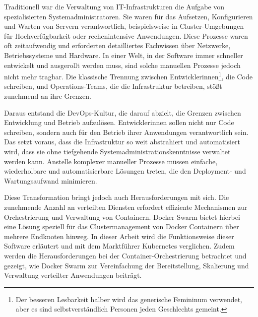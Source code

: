 Traditionell war die Verwaltung von IT-Infrastrukturen die Aufgabe von spezialisierten Systemadministratoren. Sie waren für das Aufsetzen, Konfigurieren und Warten von Servern verantwortlich, beispielsweise in Cluster-Umgebungen für Hochverfügbarkeit oder rechenintensive Anwendungen. Diese Prozesse waren oft zeitaufwendig und erforderten detailliertes Fachwissen über Netzwerke, Betriebssysteme und Hardware. In einer Welt, in der Software immer schneller entwickelt und ausgerollt werden muss, sind solche manuellen Prozesse jedoch nicht mehr tragbar. Die klassische Trennung zwischen Entwicklerinnen\footnote{Der besseren Lesbarkeit halber wird das generische Femininum verwendet, aber es sind selbstverst\"andlich Personen jeden Geschlechts gemeint.}, die Code schreiben, und Operations-Teams, die die Infrastruktur betreiben, stößt zunehmend an ihre Grenzen.

Daraus entstand die DevOps-Kultur, die darauf abzielt, die Grenzen zwischen Entwicklung und Betrieb aufzulösen. Entwicklerinnen sollen nicht nur Code schreiben, sondern auch für den Betrieb ihrer Anwendungen verantwortlich sein. Das setzt voraus, dass die Infrastruktur so weit abstrahiert und automatisiert wird, dass sie ohne tiefgehende Systemadministrationskenntnisse verwaltet werden kann. Anstelle komplexer manueller Prozesse müssen einfache, wiederholbare und automatisierbare Lösungen treten, die den Deployment- und Wartungsaufwand minimieren.

Diese Transformation bringt jedoch auch Herausforderungen mit sich. Die zunehmende Anzahl an verteilten Diensten erfordert effiziente Mechanismen zur Orchestrierung und Verwaltung von Containern. Docker Swarm bietet hierbei eine Lösung speziell für das Clustermanagement von Docker Containern \"uber mehrere Endknoten hinweg. In dieser Arbeit wird die Funktionsweise dieser Software erläutert und mit dem Marktf\"uhrer Kubernetes verglichen. Zudem werden die Herausforderungen bei der Container-Orchestrierung betrachtet und gezeigt, wie Docker Swarm zur Vereinfachung der Bereitstellung, Skalierung und Verwaltung verteilter Anwendungen beiträgt.
